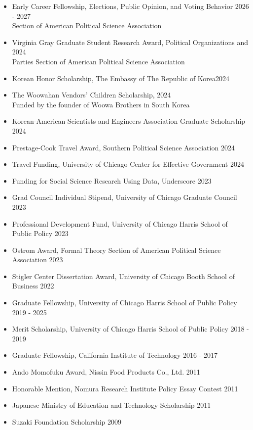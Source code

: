 \documentclass[11pt, Letter]{article}
\begin{document}
\vspace{3mm}



\begin{itemize}[leftmargin=47pt,itemindent=-21pt]
    \item[] Early Career Fellowship, Elections, Public Opinion, and Voting Behavior \hfill 2026 - 2027\\
    Section of American Political Science Association
    \item[] Virginia Gray Graduate Student Research Award, Political Organizations and  \hfill 2024\\
    Parties Section of American Political Science Association
    \item[] Korean Honor Scholarship, The Embassy of The Republic of Korea\hfill2024
    \item[] The Woowahan Vendors' Children Scholarship, \hfill 2024\\
    Funded by the founder of Woowa Brothers in South Korea
    \item[] Korean-American Scientists and Engineers Association Graduate Scholarship \hfill 2024
    \item[] Prestage-Cook Travel Award, Southern Political Science Association \hfill 2024
    \item[] Travel Funding, University of Chicago Center for Effective Government \hfill 2024
    \item[] Funding for Social Science Research Using Data, Underscore \hfill 2023
    \item[] Grad Council Individual Stipend, University of Chicago Graduate Council \hfill 2023
    \item[] Professional Development Fund, University of Chicago Harris School of Public Policy \hfill 2023
    \item[] Ostrom Award, Formal Theory Section of American Political Science Association \hfill 2023
    \item[] Stigler Center Dissertation Award, University of Chicago Booth School of Business \hfill 2022
    \item[] Graduate Fellowship, University of Chicago Harris School of Public Policy \hfill 2019 - 2025
    \item[] Merit Scholarship, University of Chicago Harris School of Public Policy \hfill 2018 - 2019
    \item[] Graduate Fellowship, California Institute of Technology	\hfill 2016 - 2017
    \item[] Ando Momofuku Award, Nissin Food Products Co., Ltd.	\hfill 2011
    \item[] Honorable Mention, Nomura Research Institute Policy Essay Contest \hfill 2011
    \item[] Japanese Ministry of Education and Technology Scholarship	\hfill 2011
    \item[] Suzaki Foundation Scholarship	\hfill 2009
\end{itemize}
\end{document}
